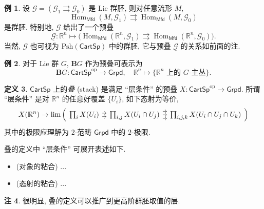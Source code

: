 \documentclass{article}
\theoremstyle{definition}
\newtheorem{definition}{定义}[section]
\newtheorem{example}[definition]{例}
\newtheorem{remark}[definition]{注}
\newcommand{\CartSp}{\mathsf{CartSp}}
\newcommand{\Mfd}{\mathsf{Mfd}}
\newcommand{\op}{\mathrm{op}}
\newcommand{\Psh}{\mathrm{Psh}}
\newcommand{\Grpd}{\mathsf{Grpd}}
\begin{document}
	\begin{example}
		设 $\mathcal G = (\mathcal G_1\rightrightarrows \mathcal G_0)$ 是 Lie 群胚, 则对任意流形 $M$, $$\operatorname{Hom}_{\Mfd}(M,\mathcal G_1)\rightrightarrows\operatorname{Hom}_{\Mfd}(M,\mathcal G_0)$$ 是群胚. 特别地, $\mathcal G$ 给出了一个预叠
		$$
		\underline{\mathcal G}\colon \mathbb{R}^n\mapsto \big({\operatorname{Hom}_{\Mfd}(\mathbb{R}^n,\mathcal G_1)\rightrightarrows\operatorname{Hom}_{\Mfd}(\mathbb{R}^n,\mathcal G_0)}\big).
		$$
		当然, $\mathcal G$ 也可视为 $\Psh(\CartSp)$ 中的群胚, 它与预叠 $\underline{\mathcal G}$ 的关系如前面的注.
	\end{example}
	
	\begin{example}
		对于 Lie 群 $G$, $\mathbf BG$ 作为预叠可表示为
		$$
		\mathbf BG\colon\CartSp^{\op}\to\Grpd,\quad\mathbb R^n \mapsto \{\text{$\mathbb R^n$ 上的 $G$-主丛}\}.
		$$
	\end{example}
	
	\begin{definition}
		$\CartSp$ 上的\emph{叠} (stack) 是满足 ``层条件'' 的预叠 $X\colon \CartSp^{\op}\to\Grpd$.
		所谓 ``层条件'' 是对 $\mathbb R^n$ 的任意好覆盖 $\{U_i\}$, 如下态射为等价,
		$$
		X(\mathbb R^n) \to \lim\Big({
			\begin{tikzcd}[ampersand replacement=\&,sep=tiny]
				{\prod_iX(U_i)} \& {\prod_{i,j}X(U_i\cap U_j)} \& {\prod_{i,j,k}X(U_i\cap U_j\cap U_k)}
				\arrow[shift right, from=1-1, to=1-2]
				\arrow[shift left, from=1-1, to=1-2]
				\arrow[from=1-2, to=1-3]
				\arrow[shift right=2, from=1-2, to=1-3]
				\arrow[shift left=2, from=1-2, to=1-3]
			\end{tikzcd}
		}\Big)
		$$
		其中的极限应理解为 $2$-范畴 $\Grpd$ 中的 $2$-极限.
	\end{definition}
	
	叠的定义中 ``层条件'' 可展开表述如下.
	\begin{itemize}
		\item (对象的粘合) ...
		\item (态射的粘合) ...
	\end{itemize}
	
	\begin{remark}
		很明显, 叠的定义可以推广到更高阶群胚取值的层.
	\end{remark}
	
\end{document}
